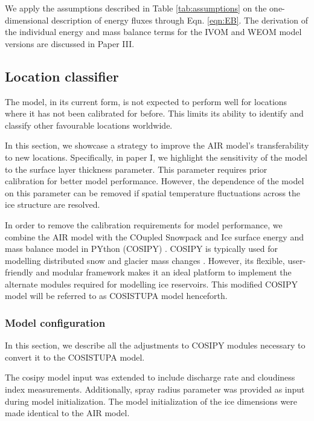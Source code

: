 We apply the assumptions described in Table \ref{tab:assumptions} on the one-dimensional description of energy
fluxes through Eqn. \ref{eqn:EB}. The derivation of the individual energy and mass balance terms for the IVOM
and WEOM model versions are discussed in Paper III.

\subsection{Location classifier}

The model, in its current form, is not expected to perform well for locations where it has not been calibrated
for before. This limits its ability to identify and classify other favourable locations worldwide.

In this section, we showcase a strategy to improve the AIR model's transferability to new locations.
Specifically, in paper I, we highlight the sensitivity of the model to the surface layer thickness parameter.
This parameter requires prior calibration for better model performance. However, the dependence of the model on
this parameter can be removed if spatial temperature fluctuations across the ice structure are resolved.

In order to remove the calibration requirements for model performance, we combine the AIR model with the COupled
Snowpack and Ice surface energy and mass balance model in PYthon (COSIPY) . COSIPY is typically used for
modelling distributed snow and glacier mass changes \citep{sauterCOSIPYV1Opensource2020}. However, its flexible,
user-friendly and modular framework makes it an ideal platform to implement the alternate modules required for
modelling ice reservoirs. This modified COSIPY model will be referred to as COSISTUPA model henceforth.

\subsubsection{Model configuration}

In this section, we describe all the adjustments to COSIPY modules necessary to convert it to the COSISTUPA
model.

The cosipy model input was extended to include discharge rate and cloudiness index measurements. Additionally,
spray radius parameter was provided as input during model initialization. The model initialization of the ice
dimensions were made identical to the AIR model. 

